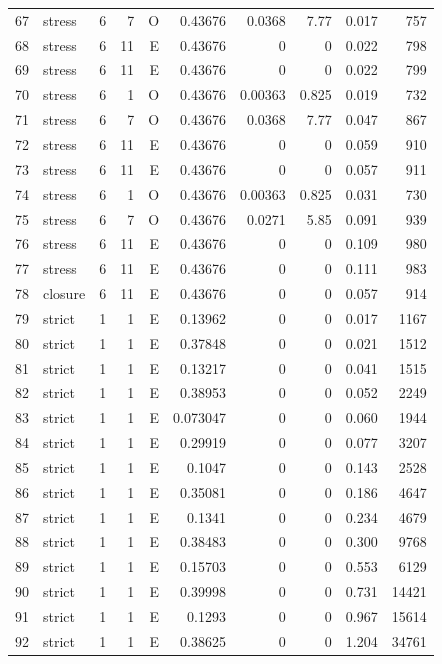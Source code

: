 \begin{longtable}{rlrrrrrrrr}
67 & stress & 6 & 7 & O & 0.43676 & 0.0368 & 7.77 & 0.017 & 757 \\
68 & stress & 6 & 11 & E & 0.43676 & 0 & 0 & 0.022 & 798 \\
69 & stress & 6 & 11 & E & 0.43676 & 0 & 0 & 0.022 & 799 \\
70 & stress & 6 & 1 & O & 0.43676 & 0.00363 & 0.825 & 0.019 & 732 \\
71 & stress & 6 & 7 & O & 0.43676 & 0.0368 & 7.77 & 0.047 & 867 \\
72 & stress & 6 & 11 & E & 0.43676 & 0 & 0 & 0.059 & 910 \\
73 & stress & 6 & 11 & E & 0.43676 & 0 & 0 & 0.057 & 911 \\
74 & stress & 6 & 1 & O & 0.43676 & 0.00363 & 0.825 & 0.031 & 730 \\
75 & stress & 6 & 7 & O & 0.43676 & 0.0271 & 5.85 & 0.091 & 939 \\
76 & stress & 6 & 11 & E & 0.43676 & 0 & 0 & 0.109 & 980 \\
77 & stress & 6 & 11 & E & 0.43676 & 0 & 0 & 0.111 & 983 \\
78 & closure & 6 & 11 & E & 0.43676 & 0 & 0 & 0.057 & 914 \\
79 & strict & 1 & 1 & E & 0.13962 & 0 & 0 & 0.017 & 1167 \\
80 & strict & 1 & 1 & E & 0.37848 & 0 & 0 & 0.021 & 1512 \\
81 & strict & 1 & 1 & E & 0.13217 & 0 & 0 & 0.041 & 1515 \\
82 & strict & 1 & 1 & E & 0.38953 & 0 & 0 & 0.052 & 2249 \\
83 & strict & 1 & 1 & E & 0.073047 & 0 & 0 & 0.060 & 1944 \\
84 & strict & 1 & 1 & E & 0.29919 & 0 & 0 & 0.077 & 3207 \\
85 & strict & 1 & 1 & E & 0.1047 & 0 & 0 & 0.143 & 2528 \\
86 & strict & 1 & 1 & E & 0.35081 & 0 & 0 & 0.186 & 4647 \\
87 & strict & 1 & 1 & E & 0.1341 & 0 & 0 & 0.234 & 4679 \\
88 & strict & 1 & 1 & E & 0.38483 & 0 & 0 & 0.300 & 9768 \\
89 & strict & 1 & 1 & E & 0.15703 & 0 & 0 & 0.553 & 6129 \\
90 & strict & 1 & 1 & E & 0.39998 & 0 & 0 & 0.731 & 14421 \\
91 & strict & 1 & 1 & E & 0.1293 & 0 & 0 & 0.967 & 15614 \\
92 & strict & 1 & 1 & E & 0.38625 & 0 & 0 & 1.204 & 34761 \\

\end{longtable}
